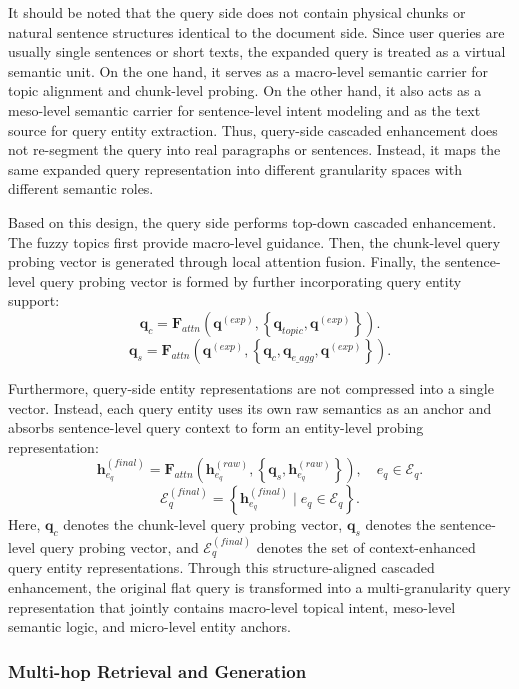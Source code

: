 \documentclass[preprint,12pt]{elsarticle}
\begin{document}
It should be noted that the query side does not contain physical chunks or natural sentence structures identical to the document side. Since user queries are usually single sentences or short texts, the expanded query is treated as a virtual semantic unit. On the one hand, it serves as a macro-level semantic carrier for topic alignment and chunk-level probing. On the other hand, it also acts as a meso-level semantic carrier for sentence-level intent modeling and as the text source for query entity extraction. Thus, query-side cascaded enhancement does not re-segment the query into real paragraphs or sentences. Instead, it maps the same expanded query representation into different granularity spaces with different semantic roles.

Based on this design, the query side performs top-down cascaded enhancement. The fuzzy topics first provide macro-level guidance. Then, the chunk-level query probing vector is generated through local attention fusion. Finally, the sentence-level query probing vector is formed by further incorporating query entity support:
\[
\mathbf{q}_{c}
=
\mathbf{F}_{attn}
\left(
\mathbf{q}^{(exp)},
\left\{
\mathbf{q}_{topic},
\mathbf{q}^{(exp)}
\right\}
\right).
\]
\[
\mathbf{q}_{s}
=
\mathbf{F}_{attn}
\left(
\mathbf{q}^{(exp)},
\left\{
\mathbf{q}_{c},
\mathbf{q}_{e\_agg},
\mathbf{q}^{(exp)}
\right\}
\right).
\]

Furthermore, query-side entity representations are not compressed into a single vector. Instead, each query entity uses its own raw semantics as an anchor and absorbs sentence-level query context to form an entity-level probing representation:
\[
\mathbf{h}_{e_q}^{(final)}
=
\mathbf{F}_{attn}
\left(
\mathbf{h}_{e_q}^{(raw)},
\left\{
\mathbf{q}_{s},
\mathbf{h}_{e_q}^{(raw)}
\right\}
\right),
\quad e_q \in \mathcal{E}_{q}.
\]
\[
\mathcal{E}_{q}^{(final)}
=
\left\{
\mathbf{h}_{e_q}^{(final)}
\mid
e_q \in \mathcal{E}_{q}
\right\}.
\]
Here, $\mathbf{q}_{c}$ denotes the chunk-level query probing vector, $\mathbf{q}_{s}$ denotes the sentence-level query probing vector, and $\mathcal{E}_{q}^{(final)}$ denotes the set of context-enhanced query entity representations. Through this structure-aligned cascaded enhancement, the original flat query is transformed into a multi-granularity query representation that jointly contains macro-level topical intent, meso-level semantic logic, and micro-level entity anchors.

\subsubsection{Multi-hop Retrieval and Generation}
\end{document}
